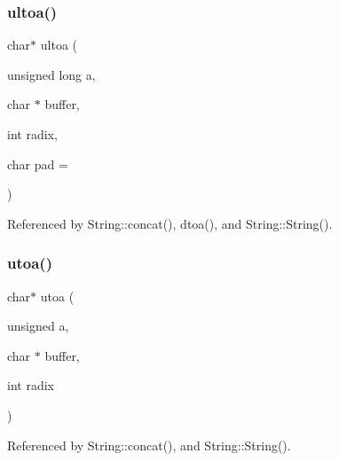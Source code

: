 \subsubsection{ultoa()}
{\footnotesize\ttfamily char$\ast$ ultoa (\begin{DoxyParamCaption}\item[{unsigned long}]{a,  }\item[{char $\ast$}]{buffer,  }\item[{int}]{radix,  }\item[{char}]{pad = {} }\end{DoxyParamCaption})}



Referenced by String\+::concat(), dtoa(), and String\+::\+String().

\mbox{\label{string__convert_8h_a3c5d4c5b67dda03ab43c5a83d911cf25}} 
\subsubsection{utoa()}
{\footnotesize\ttfamily char$\ast$ utoa (\begin{DoxyParamCaption}\item[{unsigned}]{a,  }\item[{char $\ast$}]{buffer,  }\item[{int}]{radix }\end{DoxyParamCaption})}



Referenced by String\+::concat(), and String\+::\+String().

